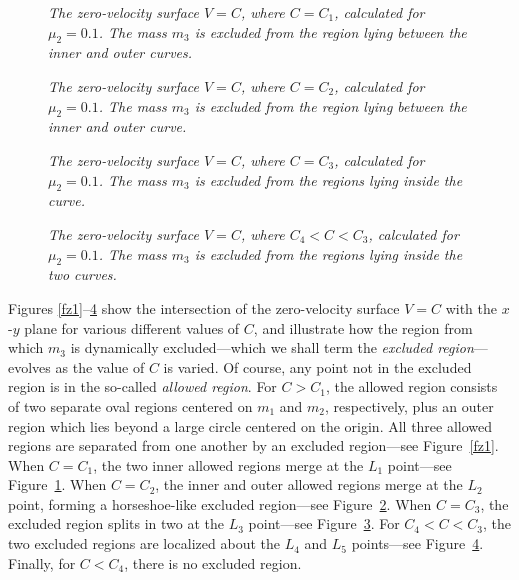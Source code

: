 \begin{figure}
\centerline{}
\caption{\em The zero-velocity surface $V=C$, where $C= C_1$, calculated for $\mu_2=0.1$. The mass $m_3$ is excluded
from the region lying between the  inner and  outer curves.}\label{fz2}
\end{figure}

\begin{figure}
\centerline{}
\caption{\em The zero-velocity surface $V=C$, where $C= C_2$, calculated for $\mu_2=0.1$.  The mass $m_3$ is excluded
from the region lying between the inner and  outer curve.}\label{fz3}
\end{figure}

\begin{figure}
\centerline{}
\caption{\em The zero-velocity surface $V=C$, where $C =C_3$, calculated for $\mu_2=0.1$.  The mass $m_3$ is excluded
from the regions lying inside the  curve.}\label{fz4}
\end{figure}

\begin{figure}
\centerline{}
\caption{\em The zero-velocity surface $V=C$, where $C_4< C < C_3$, calculated for $\mu_2=0.1$.  The mass $m_3$ is excluded
from the regions lying inside the two curves.}\label{fz5}
\end{figure}

Figures \ref{fz1}--\ref{fz5} show the intersection of the zero-velocity
surface $V=C$ with the $x$-$y$ plane for various different values of $C$, and
illustrate how the region from which $m_3$ is dynamically excluded---which we shall term the {\em excluded region}---evolves as the value of
$C$ is varied. Of course, any point not in the excluded region is in the so-called {\em allowed region}.
For $C> C_1$, the allowed region consists of two
separate oval regions centered on $m_1$ and $m_2$, respectively,  plus an
outer region which lies beyond a
large circle centered on the origin. All three allowed regions are separated
from one another by an excluded region---see Figure~\ref{fz1}. When $C=C_1$,
the two inner allowed regions merge at the $L_1$ point---see Figure~\ref{fz2}.
When $C=C_2$, the inner and outer allowed regions merge at the $L_2$ point, forming a  horseshoe-like excluded region---see Figure~\ref{fz3}.
When $C=C_3$, the excluded region splits in two at the $L_3$ point---see Figure~\ref{fz4}.
For $C_4 < C < C_3$, the two excluded  regions are localized about the
$L_4$ and 
$L_5$ points---see Figure~\ref{fz5}. Finally, for $C < C_4$, there is no excluded
region.

